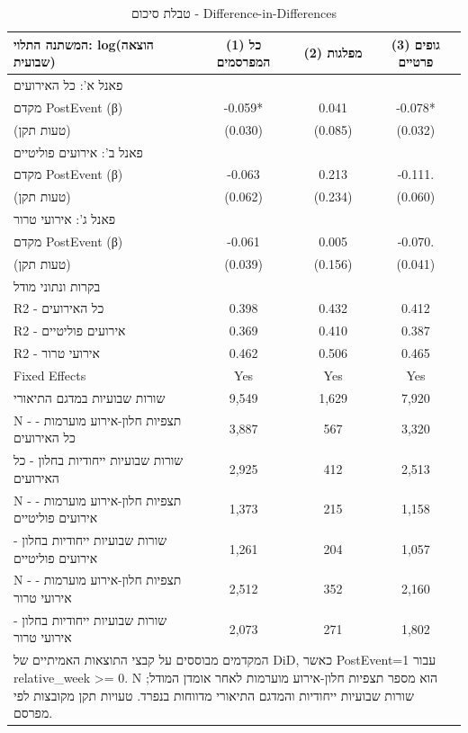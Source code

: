 \begin{table}[!htbp]
\centering
\caption{טבלת סיכום - Difference-in-Differences}
\label{tab:did_panel_summary_post_from_0}
\begin{tabular}{lccc}
\hline\hline
המשתנה התלוי: log(הוצאה שבועית) & (1) כל המפרסמים & (2) מפלגות & (3) גופים פרטיים \\
\hline
\multicolumn{4}{l}{פאנל א': כל האירועים} \\
מקדם PostEvent (β) & -0.059* & 0.041 & -0.078* \\
(טעות תקן) & (0.030) & (0.085) & (0.032) \\
\multicolumn{4}{l}{פאנל ב': אירועים פוליטיים} \\
מקדם PostEvent (β) & -0.063 & 0.213 & -0.111. \\
(טעות תקן) & (0.062) & (0.234) & (0.060) \\
\multicolumn{4}{l}{פאנל ג': אירועי טרור} \\
מקדם PostEvent (β) & -0.061 & 0.005 & -0.070. \\
(טעות תקן) & (0.039) & (0.156) & (0.041) \\
\multicolumn{4}{l}{בקרות ונתוני מודל} \\
R2 - כל האירועים & 0.398 & 0.432 & 0.412 \\
R2 - אירועים פוליטיים & 0.369 & 0.410 & 0.387 \\
R2 - אירועי טרור & 0.462 & 0.506 & 0.465 \\
Fixed Effects & Yes & Yes & Yes \\
שורות שבועיות במדגם התיאורי & 9,549 & 1,629 & 7,920 \\
N - תצפיות חלון-אירוע מוערמות - כל האירועים & 3,887 & 567 & 3,320 \\
שורות שבועיות ייחודיות בחלון - כל האירועים & 2,925 & 412 & 2,513 \\
N - תצפיות חלון-אירוע מוערמות - אירועים פוליטיים & 1,373 & 215 & 1,158 \\
שורות שבועיות ייחודיות בחלון - אירועים פוליטיים & 1,261 & 204 & 1,057 \\
N - תצפיות חלון-אירוע מוערמות - אירועי טרור & 2,512 & 352 & 2,160 \\
שורות שבועיות ייחודיות בחלון - אירועי טרור & 2,073 & 271 & 1,802 \\
\hline
\multicolumn{4}{l}{\footnotesize המקדמים מבוססים על קבצי התוצאות האמיתיים של DiD, כאשר PostEvent=1 עבור relative\_week >= 0. N הוא מספר תצפיות חלון-אירוע מוערמות לאחר אומדן המודל; שורות שבועיות ייחודיות והמדגם התיאורי מדווחות בנפרד. טעויות תקן מקובצות לפי מפרסם.} \\
\hline\hline
\end{tabular}
\end{table}
